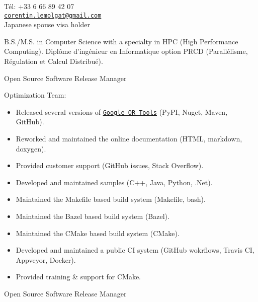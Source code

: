 \documentclass{article}
\begin{document}


T\'{e}l: +33 6 66 89 42 07\\
\href{mailto:corentin.lemolgat@gmail.com}{\texttt{corentin.lemolgat@gmail.com}}\\
 {
Japanese spouse visa holder\\
} {
}

\begin{llist}

 
 {
B.S./M.S. in Computer Science with a specialty in HPC (High Performance Computing).
} {
Dipl\^{o}me d'ing\'{e}nieur en Informatique option PRCD (Parall\'{e}lisme,
R\'{e}gulation et Calcul Distribu\'{e}).
}

 {
} {
}
\vspace{-0.33cm}

 {
} {
}
 {
Open Source Software Release Manager\\
\vspace{-0.33cm}

Optimization Team:
\vspace{-0.33cm}
\begin{itemize}
	\item Released several versions of
    \href{https://github.com/google/or-tools}{\texttt{Google OR-Tools}} (PyPI, Nuget, Maven, GitHub).
	\item Reworked and maintained the online documentation (HTML, markdown, doxygen).
	\item Provided customer support (GitHub issues, Stack Overflow).
	\item Developed and maintained samples (C++, Java, Python, .Net).
	\item Maintained the Makefile based build system (Makefile, bash).
	\item Maintained the Bazel based build system (Bazel).
	\item Maintained the CMake based build system (CMake).
	\item Developed and maintained a public CI system (GitHub wokrflows, Travis CI, Appveyor, Docker).
	\item Provided training \& support for CMake.
\end{itemize}
} {
Open Source Software Release Manager\\
\vspace{-0.33cm}

}
\end{llist}
\end{document}

